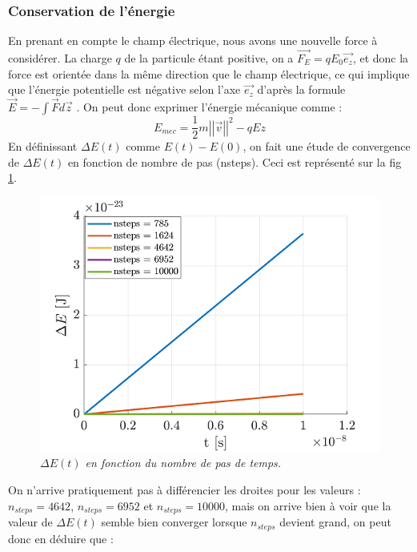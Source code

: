 \documentclass[a4paper,12pt,twoside]{article}
\begin{document}
			
	\subsubsection{Conservation de l'\'energie}
	\noindent En prenant en compte le champ \'electrique, nous avons une nouvelle force \`a consid\'erer. La charge $q$ de la particule \'etant positive, on a $\Vec{F_E} = qE_0\Vec{e_z}$, et donc la force est orient\'ee dans la m\^eme direction que le champ \'electrique, ce qui implique que l'\'energie potentielle est n\'egative selon l'axe $\Vec{e_z}$ d'apr\`es la formule $\Vec{E} = -\int \Vec{F}d\Vec{z}$ \cite{FT}. On peut donc exprimer l'\'energie m\'ecanique comme : 
	\begin{equation}\label{e_m_b_ii}
	E_{mec} = \frac{1}{2}m\left|\left|\Vec{v}\right|\right|^2 - qEz
	\end{equation}
	En d\'efinissant $\Delta E(t)$ comme $E(t)-E(0)$, on fait une \'etude de convergence de $\Delta E(t)$ en fonction de nombre de pas (nsteps). Ceci est repr\'esent\'e sur la fig \ref{Fig: Cons Emec}.
	
	\begin{figure}[h]
					\centering
					\includegraphics[scale = 0.6]{ener_mec_cons.png}
					\caption{\em\label{Fig: Cons Emec} $\Delta E(t)$ en fonction du nombre de pas de temps.}
	\end{figure}
\noindent On n'arrive pratiquement pas \`a diff\'erencier les droites pour les valeurs : $n_{steps} = 4642$, $n_{steps} = 6952$ et $n_{steps} = 10000$, mais on arrive bien \`a voir que la valeur de $\Delta E(t)$ semble bien converger lorsque $n_{steps}$ devient grand, on peut donc en d\'eduire que :
\end{document}
